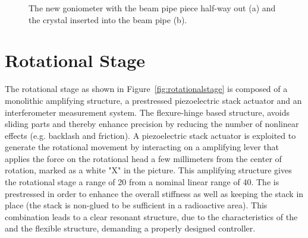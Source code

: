 \begin{figure}[tpb]
  \centering %
  \qquad
  \caption{\label{fig:collimator-t} The new goniometer with the beam pipe piece half-way out (a) and the crystal inserted into the beam pipe (b).}
\end{figure}

\FloatBarrier
\section{Rotational Stage}
\label{sec:rotational_stage}
The rotational stage as shown in Figure~\ref{fig:rotationalstage} is composed of a monolithic amplifying structure, a prestressed piezoelectric stack actuator and an interferometer measurement system. The flexure-hinge based structure, avoids sliding parts and thereby enhance precision by reducing the number of nonlinear effects (e.g. backlash and friction). A piezoelectric stack actuator is exploited to generate the rotational movement by interacting on a amplifying lever that applies the force on the rotational head a few millimeters from the center of rotation, marked as a white "X" in the picture. This amplifying structure gives the rotational stage a range of \unit{20}{\milli\rad} from a nominal linear range of \unit{40}{\micro\meter}.  The \abbrPEA is prestressed in order to enhance the overall stiffness as well as keeping the stack in place (the stack is non-glued to be sufficient in a radioactive area). This combination leads to a clear resonant structure, due to the characteristics of the \abbrPEA and the flexible structure, demanding a properly designed controller.

